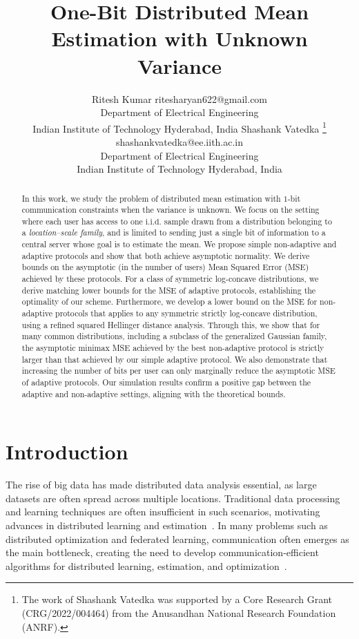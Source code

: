\documentclass[10pt]{article} %
\title{One-Bit Distributed Mean Estimation with Unknown \mbox{Variance}}
\author{\name Ritesh Kumar \email ritesharyan622@gmail.com \\
      \addr Department of Electrical Engineering \\
      Indian Institute of Technology Hyderabad, India
      \AND
      \name Shashank Vatedka \thanks{The work of Shashank Vatedka was supported by a Core Research Grant (CRG/2022/004464) from the Anusandhan National Research Foundation (ANRF).} \email shashankvatedka@ee.iith.ac.in \\
      \addr Department of Electrical Engineering \\
      Indian Institute of Technology Hyderabad, India}
\newcommand{\iid}{\text{i.i.d.}}
\theoremstyle{plain}
\theoremstyle{definition}
\theoremstyle{remark}
\begin{document}
\maketitle

\begin{abstract}
In this work, we study the problem of distributed mean estimation with $1$-bit communication constraints when the variance is unknown. We focus on the setting where each user has access to one $\iid$ sample drawn from a distribution belonging to a \emph{location–scale family}, and is limited to sending just a single bit of information to a central server whose goal is to estimate the mean. We propose simple non-adaptive and adaptive protocols and show that both achieve asymptotic normality. We derive bounds on the asymptotic (in the number of users) Mean Squared Error (MSE) achieved by these protocols. For a class of symmetric log-concave distributions, we derive matching lower bounds for the MSE of adaptive protocols, establishing the optimality of our scheme. Furthermore, we develop a lower bound on the MSE for non-adaptive protocols that applies to any symmetric strictly log-concave distribution, using a refined squared Hellinger distance analysis. Through this, we show that for many common distributions, including a subclass of the generalized Gaussian family, the asymptotic minimax MSE achieved by the best non-adaptive protocol is strictly larger than that achieved by our simple adaptive protocol. We also demonstrate that increasing the number of bits per user can only marginally reduce the asymptotic MSE of adaptive protocols. Our simulation results confirm a positive gap between the adaptive and non-adaptive settings, aligning with the theoretical bounds.
\end{abstract}



\section{Introduction}
The rise of big data has made distributed data analysis essential, as large datasets are often spread across multiple locations. Traditional data processing and learning techniques are often insufficient in such scenarios, motivating advances in distributed learning and estimation~\citep{mcmahan2017communication,chen2021distributed,kairouz2021advances}. In many problems such as distributed optimization and federated learning, communication often emerges as the main bottleneck, creating the need to develop communication-efficient algorithms for distributed learning, estimation, and optimization~\citep{alistarh2017qsgd,chen2021distributed,li2020federated,bernstein2018signsgd,kairouz2021advances,chen2018lag,wang2018atomo}.  
\end{document}
